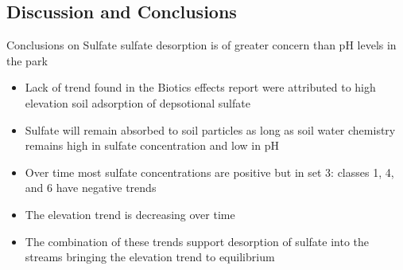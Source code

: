 \documentclass[svgnames,smaller]{beamer}
\begin{document}
	\subsection{Discussion and Conclusions}
\begin{frame}
	\begin{block}{Conclusions on Sulfate}
		sulfate desorption is of greater concern than pH levels in the park
		\begin{itemize}
			\item Lack of trend found in the Biotics effects report were attributed to high elevation soil adsorption of depsotional sulfate
			\item Sulfate will remain absorbed to soil particles as long as soil water chemistry remains high in sulfate concentration and low in pH
			\item Over time most sulfate concentrations are positive but in set 3: classes 1, 4, and 6 have negative trends
			\item The elevation trend is decreasing over time
			\item The combination of these trends support desorption of sulfate into the streams bringing the elevation trend to equilibrium
		\end{itemize}
	\end{block}
\end{frame}
		
\end{document}
